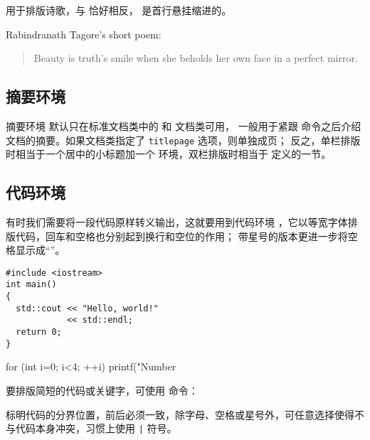  用于排版诗歌，与  恰好相反， 是首行悬挂缩进的。
\begin{example}
Rabindranath Tagore's short poem:
\begin{verse}
Beauty is truth's smile
when she beholds her own face in
a perfect mirror.
\end{verse}
\end{example}

\subsection{摘要环境}\label{subsec:abstract}

摘要环境  默认只在标准文档类中的  和  文档类可用，
一般用于紧跟  命令之后介绍文档的摘要。如果文档类指定了 \texttt{titlepage} 选项，则单独成页；
反之，单栏排版时相当于一个居中的小标题加一个  环境，双栏排版时相当于  定义的一节。

\subsection{代码环境}\label{subsec:verbatim}

有时我们需要将一段代码原样转义输出，这就要用到代码环境 ，它以等宽字体排版代码，回车和空格也分别起到换行和空位的作用；
带星号的版本更进一步将空格显示成“\textvisiblespace”。
\begin{example}
\begin{verbatim}
#include <iostream>
int main()
{
  std::cout << "Hello, world!"
            << std::endl;
  return 0;
}
\end{verbatim}
\end{example}

\begin{example}
\begin{verbatim*}
for (int i=0; i<4; ++i)
  printf("Number %d\n",i);
\end{verbatim*}
\end{example}

要排版简短的代码或关键字，可使用  命令：
\begin{command}
\end{command}

 标明代码的分界位置，前后必须一致，除字母、空格或星号外，可任意选择使得不与代码本身冲突，习惯上使用 \texttt| 符号。

